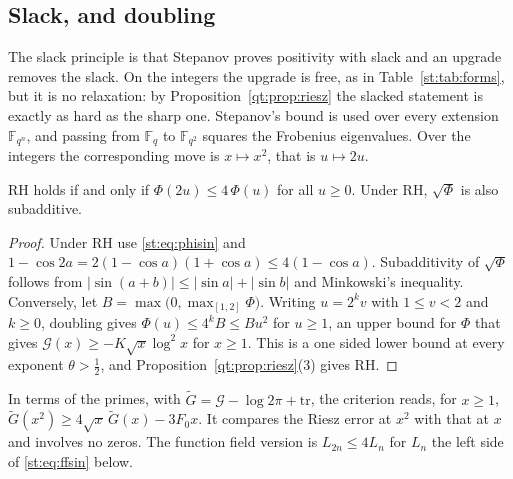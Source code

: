 \subsection{Slack, and doubling}
The slack principle is that Stepanov proves positivity with slack and an upgrade removes the slack. On the integers the upgrade is free, as in Table~\ref{st:tab:forms}, but it is no relaxation: by Proposition~\ref{qt:prop:riesz} the slacked statement is exactly as hard as the sharp one. Stepanov's bound is used over every extension $\mathbb F_{q^n}$, and passing from $\mathbb F_q$ to $\mathbb F_{q^2}$ squares the Frobenius eigenvalues. Over the integers the corresponding move is $x\mapsto x^2$, that is $u\mapsto2u$.
\begin{theorem}\label{st:thm:doubling}
RH holds if and only if $\Phi(2u)\le4\,\Phi(u)$ for all $u\ge0$. Under RH, $\sqrt\Phi$ is also subadditive.
\end{theorem}
\begin{proof}
Under RH use \eqref{st:eq:phisin} and $1-\cos2a=2(1-\cos a)(1+\cos a)\le4(1-\cos a)$. Subadditivity of $\sqrt\Phi$ follows from $|\sin(a+b)|\le|\sin a|+|\sin b|$ and Minkowski's inequality. Conversely, let $B=\max\big(0,\max_{[1,2]}\Phi\big)$. Writing $u=2^kv$ with $1\le v<2$ and $k\ge0$, doubling gives $\Phi(u)\le4^kB\le Bu^2$ for $u\ge1$, an upper bound for $\Phi$ that gives $\mathcal G(x)\ge-K\sqrt x\log^2x$ for $x\ge1$. This is a one sided lower bound at every exponent $\theta>\tfrac12$, and Proposition~\ref{qt:prop:riesz}(3) gives RH.
\end{proof}
In terms of the primes, with $\widetilde G=\mathcal G-\log2\pi+\mathrm{tr}$, the criterion reads, for $x\ge1$, $\widetilde G(x^2)\ge4\sqrt x\,\widetilde G(x)-3F_0x$. It compares the Riesz error at $x^2$ with that at $x$ and involves no zeros. The function field version is $L_{2n}\le4L_n$ for $L_n$ the left side of \eqref{st:eq:ffsin} below.

